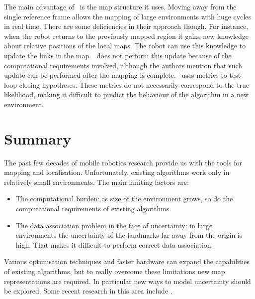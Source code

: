 The main advantage of \Atlas\ is the map structure it uses. Moving
away from the single reference frame allows the mapping of large
environments with huge cycles in real time. There are some
deficiencies in their approach though. For instance, when the robot
returns to the previously mapped region it gains new knowledge about
relative positions of the local maps. The robot can use this knowledge
to update the links in the map. \Atlas\ does not perform this update
because of the computational requirements involved, although the
authors mention that such update can be performed after the mapping is
complete. \Atlas\ uses metrics to test loop closing hypotheses. These
metrics do not necessarily correspond to the true likelihood, making
it difficult to predict the behaviour of the algorithm in a new
environment. 


\section{Summary}

The past few decades of mobile robotics research provide us with
the tools for mapping and localisation. Unfortunately, existing
algorithms work only in relatively small environments. The main
limiting factors are:

\begin{itemize}
\item The computational burden: as size of the environment grows, so do
  the computational requirements of existing algorithms.

\item The data association problem in the face of uncertainty: 
   in large environments the uncertainty of the landmarks far away
  from the origin is high. That makes it difficult to perform correct
  data association.

\end{itemize}

Various optimisation techniques and faster hardware can expand the
capabilities of existing algorithms, but to really overcome these
limitations new map representations are required. In particular new
ways to model uncertainty should be explored. Some recent research in
this area include \cite{bosse02atlas,fergusson2003}.

